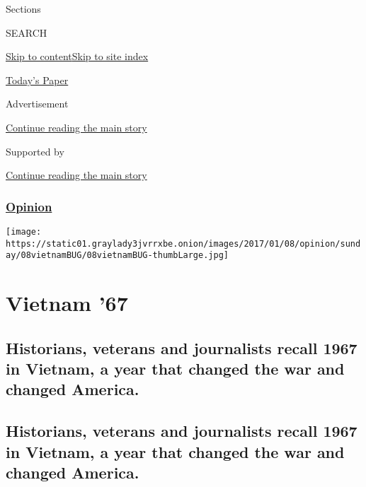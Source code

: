 Sections

SEARCH

\protect\hyperlink{site-content}{Skip to
content}\protect\hyperlink{site-index}{Skip to site index}

\href{https://myaccount.nytimes3xbfgragh.onion/auth/login?response_type=cookie\&client_id=vi}{}

\href{https://www.nytimes3xbfgragh.onion/section/todayspaper}{Today's
Paper}

Advertisement

\protect\hyperlink{after-top}{Continue reading the main story}

Supported by

\protect\hyperlink{after-sponsor}{Continue reading the main story}

\hypertarget{opinion}{%
\subsubsection{\texorpdfstring{\href{/section/opinion}{Opinion}}{Opinion}}\label{opinion}}

\texttt{[image: https://static01.graylady3jvrrxbe.onion/images/2017/01/08/opinion/sunday/08vietnamBUG/08vietnamBUG-thumbLarge.jpg]}

\hypertarget{vietnam-67}{%
\section{Vietnam '67}\label{vietnam-67}}

\hypertarget{historians-veterans-and-journalists-recall-1967-in-vietnam-a-year-that-changed-the-war-and-changed-america}{%
\subsection{Historians, veterans and journalists recall 1967 in Vietnam,
a year that changed the war and changed
America.}\label{historians-veterans-and-journalists-recall-1967-in-vietnam-a-year-that-changed-the-war-and-changed-america}}

\hypertarget{historians-veterans-and-journalists-recall-1967-in-vietnam-a-year-that-changed-the-war-and-changed-america-1}{%
\subsection{Historians, veterans and journalists recall 1967 in Vietnam,
a year that changed the war and changed
America.}\label{historians-veterans-and-journalists-recall-1967-in-vietnam-a-year-that-changed-the-war-and-changed-america-1}}

